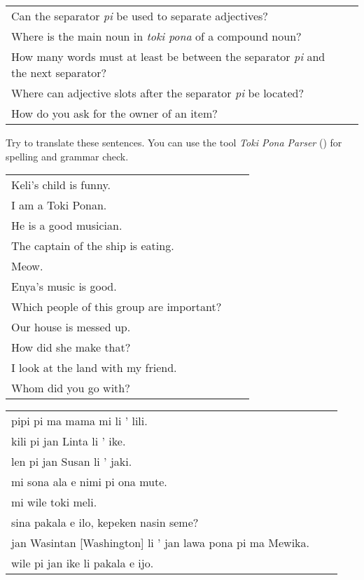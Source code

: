 \begin{supertabular}{p{5,5cm}|ll}
Can the separator \textit{pi} be used to separate adjectives? &&  \\ %
Where is the main noun in \textit{toki pona} of a compound noun? && \\ %
How many words must at least be between the separator \textit{pi} and the next separator? &&  \\ %
Where can adjective slots after the separator \textit{pi} be located? &&  \\ %
How do you ask for the owner of an item? &&  \\ %
\end{supertabular}

Try to translate these sentences. 
You can use the tool \textit{Toki Pona Parser} (\cite{www:rowa:02}) for spelling and grammar check. 

\begin{supertabular}{p{5,5cm}|ll}
Keli's child is funny.    \\ %
I am a Toki Ponan.   \\  %
He is a good musician.   \\  %
The captain of the ship is eating.    \\ %
Meow.    \\ %
Enya's music is good.    \\ %
Which people of this group are important?    \\ %
Our house is messed up.    \\ %
How did she make that?    \\ %
I look at the land with my friend. && \\ %
Whom did you go with? &&  \\  %
\end{supertabular}

\begin{supertabular}{p{5,5cm}|ll}
pipi pi ma mama mi li ' lili.  \\ %
kili pi jan Linta li ' ike.    \\ %
len pi jan Susan li ' jaki.    \\ %
mi sona ala e nimi pi ona mute.    \\ %
mi wile toki meli.    \\ %
sina pakala e ilo, kepeken nasin seme?    \\ %
jan Wasintan [Washington] li ' jan lawa pona pi ma Mewika.  \\   %
wile pi jan ike li pakala e ijo.    \\ %
\end{supertabular}  
